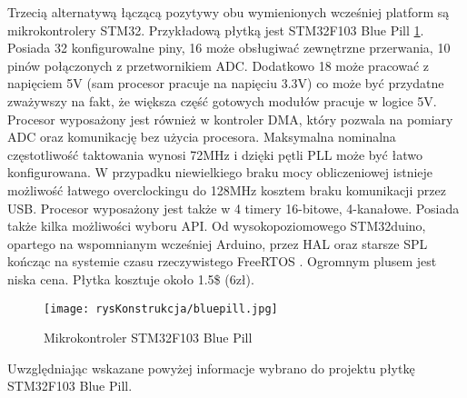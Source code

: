	Trzecią alternatywą łączącą pozytywy obu wymienionych wcześniej platform są mikrokontrolery STM32. Przykładową płytką jest STM32F103 Blue Pill \ref{fig:bluepillPlytka}. Posiada 32 konfigurowalne piny, 16 może obsługiwać zewnętrzne przerwania, 10 pinów połączonych z przetwornikiem ADC. Dodatkowo 18 może pracować z napięciem 5V (sam procesor pracuje na napięciu 3.3V) co może być przydatne zważywszy na fakt, że większa część gotowych modułów pracuje w logice 5V. Procesor wyposażony jest również w kontroler DMA, który pozwala na pomiary ADC oraz komunikację bez użycia procesora. Maksymalna nominalna częstotliwość taktowania wynosi 72MHz i dzięki pętli PLL może być łatwo konfigurowana. W przypadku niewielkiego braku mocy obliczeniowej istnieje możliwość łatwego overclockingu do 128MHz kosztem braku komunikacji przez USB. Procesor wyposażony jest także w 4 timery 16-bitowe, 4-kanałowe. Posiada także kilka możliwości wyboru API. Od wysokopoziomowego STM32duino, opartego na wspomnianym wcześniej Arduino, przez HAL oraz starsze SPL kończąc na systemie czasu rzeczywistego FreeRTOS \cite{FreeRTOS}. Ogromnym plusem jest niska cena. Płytka kosztuje około 1.5\$ (6zł).

	\begin{figure}[htb]
		\centering
		\texttt{[image: rysKonstrukcja/bluepill.jpg]} 
		\caption{Mikrokontroler STM32F103 Blue Pill}
		\label{fig:bluepillPlytka}
	\end{figure}
	
	Uwzględniając wskazane powyżej informacje wybrano do projektu płytkę STM32F103 Blue Pill.
